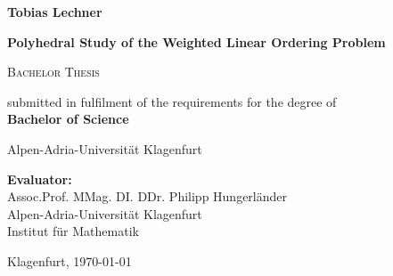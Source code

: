 \documentclass[12pt]{book}
\theoremstyle{dotless}
\begin{document}
\frontmatter
\begin{titlepage}
\vspace*{0.5cm}
  \begin{center}   
\large \textbf{Tobias Lechner}
  \end{center}
\vspace{0.6cm}
  \begin{center}
 \Huge \textbf{Polyhedral Study of the Weighted Linear Ordering Problem} 
  \end{center}
\vspace{0.6cm}
\begin{center}
\huge  \textsc{Bachelor Thesis}
\end{center}
\vspace{0.6cm}
\begin{center}
\large submitted in fulfilment of the requirements for the degree of\\
\large \textbf{Bachelor of Science}
\end{center}
\vspace{0.6cm}
\begin{center}
\large Alpen-Adria-Universität Klagenfurt\\
\end{center}
\vspace{0.6cm}
\begin{center}
\large \textbf{Evaluator:}\\
\large
Assoc.Prof. MMag. DI. DDr. Philipp Hungerländer\\
Alpen-Adria-Universität Klagenfurt\\
Institut f\"{u}r Mathematik
\end{center}
\vspace{0.6cm}
\begin{flushright} 
Klagenfurt, \today
\end{flushright}
\end{titlepage}



\thispagestyle {empty}
\cleardoublepage
\thispagestyle {empty}
\thispagestyle{empty}
\cleardoublepage
{}
\setcounter{page}{1}

\cleardoublepage
%

%

\renewcommand{\contentsname}{Content}
\tableofcontents
\thispagestyle{empty}
\cleardoublepage
\thispagestyle{empty}
\setcounter{page}{1}
\mainmatter
\pagestyle{fancy}
\fancyhead[R]{\small\thepage}
\fancyfoot[L,R,C]{}

\cleardoublepage


\renewcommand{\bibfont}{\normalsize} 

\end{document}
